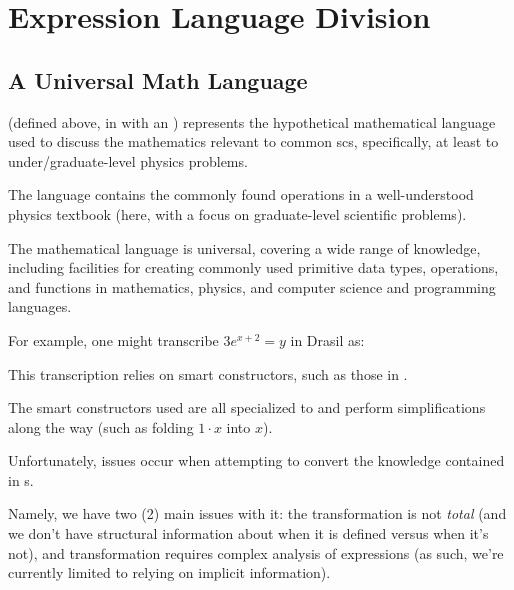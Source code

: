 \chapter{Expression Language Division}
\label{chap:lang-division}








\section{A Universal Math Language}
\label{sec:modelkinds:language}

\originalExprHaskell

\Expr{} (defined above, in  with an )
represents the hypothetical mathematical language used to discuss the
mathematics relevant to common \acs{scs}, specifically, at least to
under/graduate-level physics problems.

The language contains the commonly found operations in a well-understood physics
textbook (here, with a focus on graduate-level scientific problems).

The mathematical language is universal, covering a wide range of knowledge,
including facilities for creating commonly used primitive data types,
operations, and functions  in mathematics, physics, and computer science and
programming languages.

For example, one might transcribe \(3 e^{x + 2} = y\) in Drasil as:

\pseudoExampleExpression{}

This transcription relies on smart constructors, such as those in
.

The smart constructors used are all specialized to \Expr{} and perform
simplifications along the way (such as folding \(1 \cdot x\) into \(x\)).











Unfortunately, issues occur when attempting to convert the knowledge contained
in \RelationConcept{}s.

Namely, we have two (2) main issues with it: the transformation is not
\textit{total} (and we don't have structural information about when it is
defined versus when it's not), and transformation requires complex analysis of
expressions (as such, we're currently limited to relying on implicit
information).

